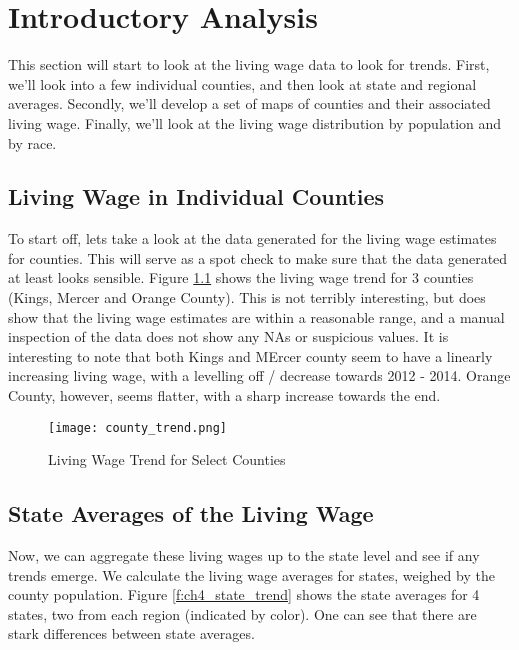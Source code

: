 \chapter{Introductory Analysis}\label{ch:intro_analysis}

This section will start to look at the living wage data to look for trends. First, we'll look into a few individual counties, and then look at state and regional averages. Secondly, we'll develop a set of maps of counties and their associated living wage. Finally, we'll look at the living wage distribution by population and by race.

\section{Living Wage in Individual Counties}

To start off, lets take a look at the data generated for the living wage estimates for counties. This will serve as a spot check to make sure that the data generated at least looks sensible. Figure \ref{f:ch4_individual} shows the living wage trend for 3 counties (Kings, Mercer and Orange County). This is not terribly interesting, but does show that the living wage estimates are within a reasonable range, and a manual inspection of the data does not show any NAs or suspicious values. It is interesting to note that both Kings and MErcer county seem to have a linearly increasing living wage, with a levelling off / decrease towards 2012 - 2014. Orange County, however, seems flatter, with a sharp increase towards the end.

\begin{figure}[H]
    \centering
        \texttt{[image: county\_trend.png]}
        \caption{Living Wage Trend for Select Counties}
    \label{f:ch4_individual}
\end{figure}


\section{State Averages of the Living Wage}

Now, we can aggregate these living wages up to the state level and see if any trends emerge. We calculate the living wage averages for states, weighed by the county population. Figure \ref{f:ch4_state_trend} shows the state averages for 4 states, two from each region (indicated by color). One can see that there are stark differences between state averages.

